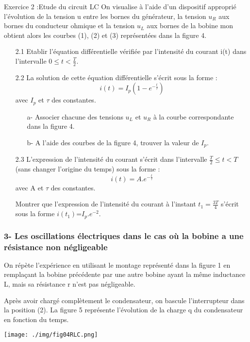 \documentclass[12pt, french]{article}
\begin{document}
\begin{Box2}{Exercice 2 :Etude du circuit LC}
On visualise à l'aide d'un dispositif approprié l'évolution de la tension u entre les bornes du générateur, la tension $u_R$ aux bornes du conducteur ohmique et la tension $u_L$ aux bornes de la bobine mon obtient alors les courbes (1), (2) et (3) représentées dans la figure 4.
\begin{enumerate}
  
  \item[2.1] Etablir l'équation différentielle vérifiée par l'intensité du courant i(t) dans l'intervalle $0 \leq t < \frac{T}{2}$.

  \item[2.2] La solution de cette équation différentielle s'écrit sous la forme :
\[ i(t) = I_p(1-e^{-\frac{t}{\tau}}) \]
avec $I_p$ et $\tau$ des constantes.
\begin{enumerate}
  \item[a-] Associer chacune des tensions $u_L$ et $u_R$ à la courbe correspondante dans la figure 4.
  \item[b-] A l'aide des courbes de la figure 4, trouver la valeur de $I_p$.
\end{enumerate}

\item[2.3] L'expression de l'intensité du courant s'écrit dans l'intervalle $\frac{T}{2} \leq t < T$ (sans changer l'origine du temps) sous la forme :
\[ i(t) = A.e^{-\frac{t}{\tau}} \]
avec A et $\tau$ des constantes.

Montrer que l'expression de l'intensité du courant à l'instant $t_1 = \frac{3T}{4}$ s'écrit sous la forme $i(t_1) $=$I_p.e^{-2}$.

\end{enumerate}
\subsubsection*{3- Les oscillations électriques dans le cas où la bobine a une résistance non négligeable}
On répète l'expérience en utilisant le montage représenté dans la figure 1 en remplaçant la bobine précédente par une autre bobine ayant la même inductance L, mais sa résistance r n'est pas négligeable.

Après avoir chargé complètement le condensateur, on bascule l'interrupteur dans la position (2).
La figure 5 représente l'évolution de la charge q du condensateur en fonction du temps.

  \begin{center}
    \texttt{[image: ./img/fig04RLC.png]}
  \end{center}


\end{Box2}
\end{document}
